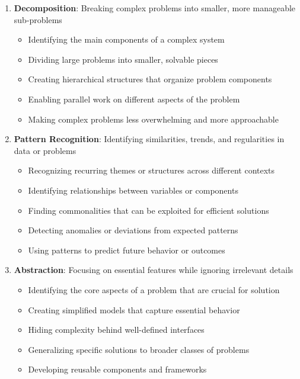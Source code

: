\begin{enumerate}
  \item \textbf{Decomposition}: Breaking complex problems into smaller, more manageable sub-problems
  \begin{itemize}
    \item Identifying the main components of a complex system
    \item Dividing large problems into smaller, solvable pieces
    \item Creating hierarchical structures that organize problem components
    \item Enabling parallel work on different aspects of the problem
    \item Making complex problems less overwhelming and more approachable
  \end{itemize}
      
  \item \textbf{Pattern Recognition}: Identifying similarities, trends, and regularities in data or problems
  \begin{itemize}
    \item Recognizing recurring themes or structures across different contexts
    \item Identifying relationships between variables or components
    \item Finding commonalities that can be exploited for efficient solutions
    \item Detecting anomalies or deviations from expected patterns
    \item Using patterns to predict future behavior or outcomes
  \end{itemize}
      
  \item \textbf{Abstraction}: Focusing on essential features while ignoring irrelevant details
  \begin{itemize}
    \item Identifying the core aspects of a problem that are crucial for solution
    \item Creating simplified models that capture essential behavior
    \item Hiding complexity behind well-defined interfaces
    \item Generalizing specific solutions to broader classes of problems
    \item Developing reusable components and frameworks
  \end{itemize}
      

\end{enumerate}
